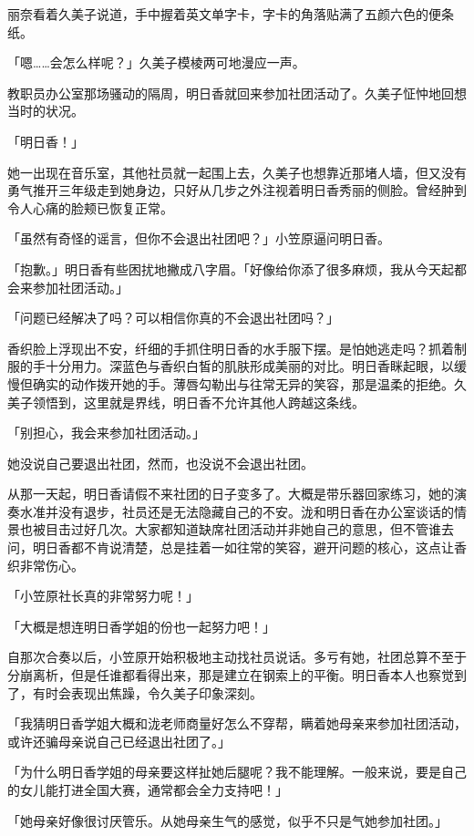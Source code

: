 \documentclass[UTF8]{ctexart}
\begin{document}
    丽奈看着久美子说道，手中握着英文单字卡，字卡的角落贴满了五颜六色的便条纸。 

    「嗯……会怎么样呢？」久美子模棱两可地漫应一声。 

    教职员办公室那场骚动的隔周，明日香就回来参加社团活动了。久美子怔忡地回想当时的状况。 

    「明日香！」 

    她一出现在音乐室，其他社员就一起围上去，久美子也想靠近那堵人墙，但又没有勇气推开三年级走到她身边，只好从几步之外注视着明日香秀丽的侧脸。曾经肿到令人心痛的脸颊已恢复正常。 

    「虽然有奇怪的谣言，但你不会退出社团吧？」小笠原逼问明日香。 

    「抱歉。」明日香有些困扰地撇成八字眉。「好像给你添了很多麻烦，我从今天起都会来参加社团活动。」 

    「问题已经解决了吗？可以相信你真的不会退出社团吗？」 

    香织脸上浮现出不安，纤细的手抓住明日香的水手服下摆。是怕她逃走吗？抓着制服的手十分用力。深蓝色与香织白皙的肌肤形成美丽的对比。明日香眯起眼，以缓慢但确实的动作拨开她的手。薄唇勾勒出与往常无异的笑容，那是温柔的拒绝。久美子领悟到，这里就是界线，明日香不允许其他人跨越这条线。 

    「别担心，我会来参加社团活动。」 

    她没说自己要退出社团，然而，也没说不会退出社团。 

    从那一天起，明日香请假不来社团的日子变多了。大概是带乐器回家练习，她的演奏水准并没有退步，社员还是无法隐藏自己的不安。泷和明日香在办公室谈话的情景也被目击过好几次。大家都知道缺席社团活动并非她自己的意思，但不管谁去问，明日香都不肯说清楚，总是挂着一如往常的笑容，避开问题的核心，这点让香织非常伤心。 

    「小笠原社长真的非常努力呢！」 

    「大概是想连明日香学姐的份也一起努力吧！」 

    自那次合奏以后，小笠原开始积极地主动找社员说话。多亏有她，社团总算不至于分崩离析，但是任谁都看得出来，那是建立在钢索上的平衡。明日香本人也察觉到了，有时会表现出焦躁，令久美子印象深刻。 

    「我猜明日香学姐大概和泷老师商量好怎么不穿帮，瞒着她母亲来参加社团活动，或许还骗母亲说自己已经退出社团了。」 

    「为什么明日香学姐的母亲要这样扯她后腿呢？我不能理解。一般来说，要是自己的女儿能打进全国大赛，通常都会全力支持吧！」 

    「她母亲好像很讨厌管乐。从她母亲生气的感觉，似乎不只是气她参加社团。」 
\end{document}
